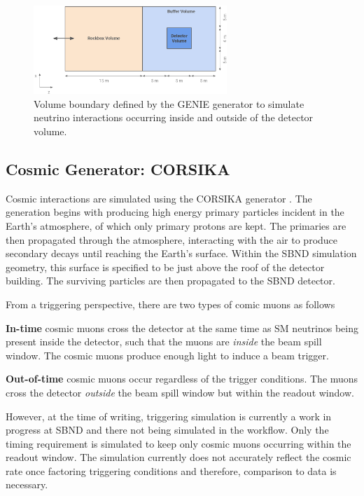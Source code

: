 \begin{figure}[htbp!] 
\centering    
\includegraphics[width=0.65\textwidth]{Rockbox_Volume}
\caption[Volume Boundary of the GENIE Generator]{
Volume boundary defined by the GENIE generator to simulate neutrino interactions occurring inside and outside of the detector volume. 
}
\label{fig:Rockbox_Volume}
\end{figure}

\subsection{Cosmic Generator: CORSIKA}
\label{sec:gen_corsika}

Cosmic interactions are simulated using the CORSIKA generator \cite{corsika}.
The generation begins with producing high energy primary particles incident in the Earth's atmosphere, of which only primary protons are kept. 
The primaries are then propagated through the atmosphere, interacting with the air to produce secondary decays until reaching the Earth's surface.
Within the SBND simulation geometry, this surface is specified to be just above the roof of the detector building.
The surviving particles are then propagated to the SBND detector.

From a triggering perspective, there are two types of comic muons as follows 
\begin{coloritemize}
        \item\textbf{In-time} cosmic muons cross the detector at the same time as SM neutrinos being present inside the detector, such that the muons are \textit{inside} the beam spill window. The cosmic muons produce enough light to induce a beam trigger.                            
        \item\textbf{Out-of-time} cosmic muons occur regardless of the trigger conditions. The muons cross the detector \textit{outside} the beam spill window but within the readout window.  
\end{coloritemize}
However, at the time of writing, triggering simulation is currently a work in progress at SBND and there not being simulated in the workflow. 
Only the timing requirement is simulated to keep only cosmic muons occurring within the readout window.
The simulation currently does not accurately reflect the cosmic rate once factoring triggering conditions and therefore, comparison to data is necessary. 

